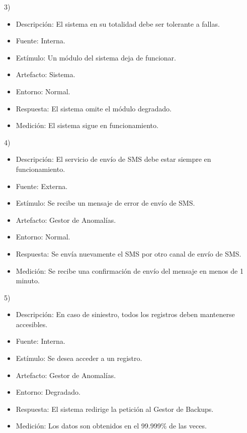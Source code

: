 \documentclass{article}
\theoremstyle{definition}
\theoremstyle{remark}
\begin{document}
3)
\begin{itemize}
  \item Descripción: El sistema en su totalidad debe ser tolerante a fallas.
  \item Fuente: Interna.
  \item Estímulo: Un módulo del sistema deja de funcionar.
  \item Artefacto: Sistema.
  \item Entorno: Normal.
  \item Respuesta: El sistema omite el módulo degradado.
  \item Medición: El sistema sigue en funcionamiento.
\end{itemize}

\pagebreak

4)
\begin{itemize}
  \item Descripción: El servicio de envío de SMS debe estar siempre en funcionamiento.
  \item Fuente: Externa.
  \item Estímulo: Se recibe un mensaje de error de envío de SMS.
  \item Artefacto: Gestor de Anomalías.
  \item Entorno: Normal.
  \item Respuesta: Se envía nuevamente el SMS por otro canal de envío de SMS.
  \item Medición: Se recibe una confirmación de envío del mensaje en menos de 1 minuto.
\end{itemize}

5)
\begin{itemize}
  \item Descripción: En caso de siniestro, todos los registros deben mantenerse accesibles.
  \item Fuente: Interna.
  \item Estímulo: Se desea acceder a un registro.
  \item Artefacto: Gestor de Anomalías.
  \item Entorno: Degradado.
  \item Respuesta: El sistema redirige la petición al Gestor de Backups.
  \item Medición: Los datos son obtenidos en el 99.999\% de las veces.
\end{itemize}
\end{document}
